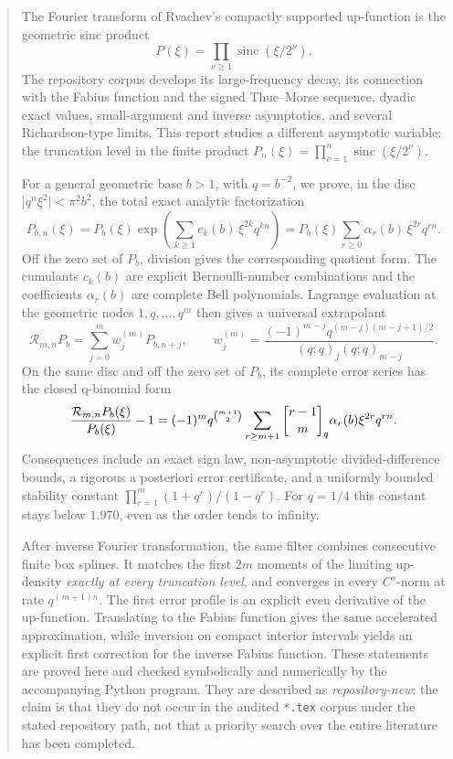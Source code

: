 \documentclass[11pt,oneside]{article}
\numberwithin{equation}{section}
\theoremstyle{definition}
\theoremstyle{remark}
\newcommand{\sinc}{\operatorname{sinc}}
\begin{document}
\begin{abstract}
The Fourier transform of Rvachev's compactly supported up-function is the geometric
sinc product
\[
   P(\xi)=\prod_{\nu\geq 1}\sinc(\xi/2^\nu).
\]
The repository corpus develops its large-frequency decay, its connection with the
Fabius function and the signed Thue--Morse sequence, dyadic exact values,
small-argument and inverse asymptotics, and several Richardson-type limits.
This report studies a different asymptotic variable: the truncation level in the
finite product
\(P_n(\xi)=\prod_{\nu=1}^n\sinc(\xi/2^\nu)\).

For a general geometric base \(b>1\), with \(q=b^{-2}\), we prove, in the
disc \(\lvert q^n\xi^2\rvert<\pi^2b^2\), the total exact analytic factorization
\[
 P_{b,n}(\xi)
 =P_b(\xi)\exp\!\left(\sum_{k\geq1}c_k(b)\,\xi^{2k}q^{kn}\right)
 =P_b(\xi)\sum_{r\geq0}\alpha_r(b)\,\xi^{2r}q^{rn}.
\]
Off the zero set of \(P_b\), division gives the corresponding quotient form.
The cumulants \(c_k(b)\) are explicit Bernoulli-number combinations and the
coefficients \(\alpha_r(b)\) are complete Bell polynomials. Lagrange evaluation
at the geometric nodes \(1,q,\ldots,q^m\) then gives a universal extrapolant
\[
 \mathcal R_{m,n}P_b=\sum_{j=0}^m w_j^{(m)}P_{b,n+j},
 \qquad
 w_j^{(m)}=\frac{(-1)^{m-j}q^{(m-j)(m-j+1)/2}}
 {(q;q)_j(q;q)_{m-j}}.
\]
On the same disc and off the zero set of \(P_b\), its complete error series has
the closed q-binomial form
\[
 \frac{\mathcal R_{m,n}P_b(\xi)}{P_b(\xi)}-1
 =(-1)^m q^{\binom{m+1}{2}}
 \sum_{r\geq m+1}\qbinomPartx{r-1}{m}\alpha_r(b)\xi^{2r}q^{rn}.
\]
Consequences include an exact sign law, non-asymptotic divided-difference bounds,
a rigorous a posteriori error certificate, and a uniformly bounded stability
constant \(\prod_{r=1}^m(1+q^r)/(1-q^r)\). For \(q=1/4\) this constant stays
below \(1.970\), even as the order tends to infinity.

After inverse Fourier transformation, the same filter combines consecutive finite
box splines. It matches the first \(2m\) moments of the limiting up-density
\emph{exactly at every truncation level}, and converges in every \(C^s\)-norm at
rate \(q^{(m+1)n}\). The first error profile is an explicit even derivative of
the up-function. Translating to the Fabius function gives the same accelerated
approximation, while inversion on compact interior intervals yields an explicit
first correction for the inverse Fabius function. These statements are proved
here and checked symbolically and numerically by the accompanying Python program.
They are described as \emph{repository-new}: the claim is that they do not occur
in the audited \texttt{*.tex} corpus under the stated repository path, not that a
priority search over the entire literature has been completed.
\end{abstract}
\end{document}
